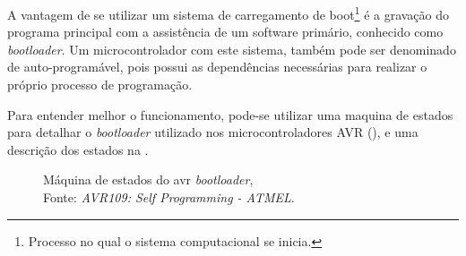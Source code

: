 A vantagem de se utilizar um sistema de carregamento de boot\footnote{Processo no qual o sistema computacional se inicia.} é
a gravação do programa principal com a assistência de um software primário, conhecido como \textit{bootloader}. Um microcontrolador
com este sistema, também pode ser denominado de auto-programável, pois possui as dependências necessárias para realizar o próprio
processo de programação.

Para entender melhor o funcionamento, pode-se utilizar uma maquina de estados para detalhar o \textit{bootloader} utilizado nos microcontroladores AVR (), e uma descrição dos estados na .

\begin{figure}[ht!]
  \centering
  \caption[Máquina de estados do avr \textit{bootloader}]{\label{fig:sm_bootloader}}{Máquina de estados
  do avr \textit{bootloader},\\Fonte: \textit{AVR109: Self Programming - ATMEL}.}
\end{figure}


